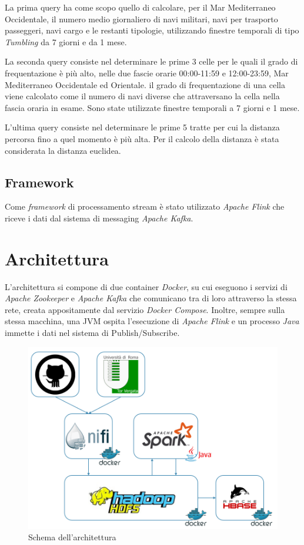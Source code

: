 \documentclass[conference]{IEEEtran}
\begin{document}
\par La prima query ha come scopo quello di calcolare, per il Mar Mediterraneo Occidentale, il numero medio giornaliero  di navi militari, navi per trasporto passeggeri, navi cargo e le restanti tipologie, utilizzando finestre temporali di tipo \emph{Tumbling} da 7 giorni e da 1 mese.

\par La seconda query consiste nel determinare le prime 3 celle per le quali il grado di frequentazione \`{e} pi\`{u} alto, nelle due fascie orarie 00:00-11:59 e 12:00-23:59, Mar Mediterraneo Occidentale ed Orientale. il grado di frequentazione di una cella viene calcolato come il numero di navi diverse che attraversano la cella nella fascia oraria in esame. Sono state utilizzate finestre temporali a 7 giorni e 1 mese.

\par L'ultima query consiste nel determinare le prime 5 tratte per cui la distanza percorsa fino a quel momento \`{e} pi\`{u} alta. Per il calcolo della distanza è stata considerata la distanza euclidea.

\subsection*{\textbf{Framework}}
Come \emph{framework} di processamento stream \`{e} stato utilizzato \emph{Apache Flink} che riceve i dati dal sistema di messaging \emph{Apache Kafka}. 

\section{\textbf{Architettura}}
L'architettura si compone di due container \emph{Docker}, su cui eseguono i servizi di \emph{Apache Zookeeper} e \emph{Apache Kafka} che comunicano tra di loro attraverso la stessa rete, creata appositamente dal servizio \emph{Docker Compose}. Inoltre, sempre sulla stessa macchina, una JVM ospita l'esecuzione di \emph{Apache Flink} e un processo \emph{Java} immette i dati nel sistema di Publish/Subscribe.

\begin{figure}[htbp]
\includegraphics[scale=0.36]{Screenshot/arch.png}
\caption{Schema dell'architettura}\label{figura:architettura}
\label{fig}
\end{figure}
\end{document}

